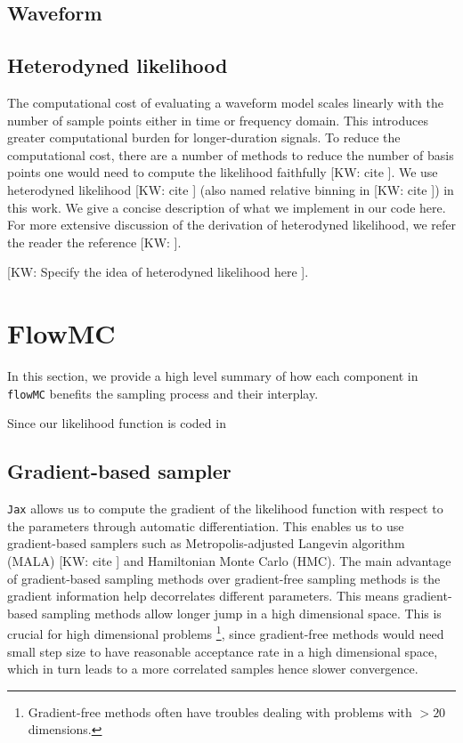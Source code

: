 \documentclass[twocolumn]{aastex631}
\newcommand{\kw}[1]{{\color{rb4}[KW: #1 ]}}
\begin{document}
\subsection{Waveform}

\subsection{Heterodyned likelihood}

The computational cost of evaluating a waveform model scales linearly with the
number of sample points either in time or frequency domain. This introduces
greater computational burden for longer-duration signals. To reduce the
computational cost, there are a number of methods to reduce the number of basis
points one would need to compute the likelihood faithfully \kw{cite}. We use
heterodyned likelihood \kw{cite} (also named relative binning in \kw{cite}) in
this work. We give a concise description of what we implement in our code here.
For more extensive discussion of the derivation of heterodyned likelihood, we
refer the reader the reference \kw{}.

\kw{Specify the idea of heterodyned likelihood here}.

\section{FlowMC}

In this section, we provide a high level summary of how each component in \texttt{flowMC} benefits the sampling process and their interplay.

Since our likelihood function is coded in 
\subsection{Gradient-based sampler}
\label{sec:gradient}

\texttt{Jax} allows us to compute the gradient of the likelihood function with
respect to the parameters through automatic differentiation. This enables us to
use gradient-based samplers such as Metropolis-adjusted Langevin algorithm
(MALA) \kw{cite} and Hamiltonian Monte Carlo (HMC)\cite{kw}. The main advantage
of gradient-based sampling methods over gradient-free sampling methods is the
gradient information help decorrelates different parameters. This means
gradient-based sampling methods allow longer jump in a high dimensional space.
This is crucial for high dimensional problems \footnote{Gradient-free methods
often have troubles dealing with problems with $>20$ dimensions.}, since
gradient-free methods would need small step size to have reasonable acceptance
rate in a high dimensional space, which in turn leads to a more correlated
samples hence slower convergence.
\end{document}
